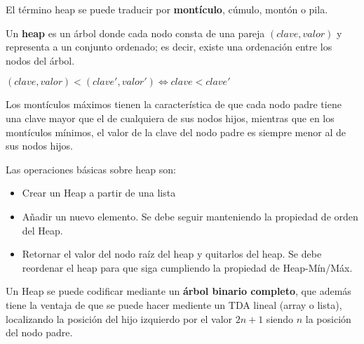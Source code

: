 


\begin{definicion}{}  \label{def:heap}
El término heap se puede traducir por \textbf{montículo}, cúmulo, montón o pila. 

Un \textbf{heap} es un árbol  donde cada nodo consta de una pareja $(clave, valor)$ y representa a un conjunto ordenado; es decir, existe una ordenación entre los nodos del árbol. 
 
 \centerline{$(clave, valor) <  (clave', valor') \Leftrightarrow  clave < clave'$}


Los montículos máximos tienen la característica de que cada nodo padre tiene una clave mayor que el de cualquiera de sus nodos hijos, mientras que en los montículos mínimos, el valor de la clave del nodo padre es siempre menor al de sus nodos hijos.



Las operaciones básicas sobre heap son:
\begin{itemize}
\item Crear un Heap a partir de una lista
\item Añadir un nuevo elemento. Se debe seguir manteniendo la propiedad de orden del Heap.
\item Retornar el valor del nodo raíz del heap y quitarlos del heap. Se debe reordenar el heap para que siga cumpliendo la propiedad de Heap-Mín/Máx.
\end{itemize}

Un Heap se puede codificar mediante un \textbf{árbol binario completo}, que además tiene la ventaja de que se puede hacer mediente un TDA lineal (array o lista), localizando la posición del hijo izquierdo por el valor $2n+1$ siendo $n$ la posición del nodo padre.

\end{definicion}
%
%
